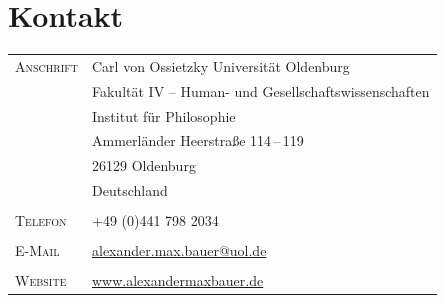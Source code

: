\documentclass[a4paper,10pt]{article}
\begin{document}
\section{Kontakt}
\begin{longtable}{p{4cm}p{11.5cm}}
   \textsc{Anschrift}   & Carl von Ossietzky Universität Oldenburg                               \\
                        & Fakultät IV -- Human- und Gesellschaftswissenschaften                  \\
                        & Institut für Philosophie                                               \\
                        & Ammerländer Heerstraße 114\,--\,119                                    \\
                        & 26129 Oldenburg                                                        \\
                        & Deutschland                                                            \\
                        &                                                                        \\
   \textsc{Telefon}     & +49 (0)441 798 2034                                                    \\
                        &                                                                        \\
   \textsc{E-Mail}      & \href{mailto:alexander.max.bauer@uol.de}{alexander.max.bauer@uol.de}   \\
                        &                                                                        \\
   \textsc{Website}     & \href{http://www.alexandermaxbauer.de/}{www.alexandermaxbauer.de}      \\
\end{longtable}


\vspace{0.5cm}
\end{document}

